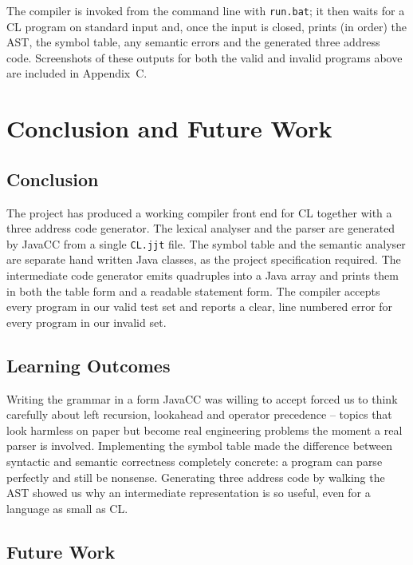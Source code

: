 \documentclass[12pt,a4paper]{report}
\begin{document}
The compiler is invoked from the command line with \texttt{run.bat}; it then waits for a CL program on standard input and, once the input is closed, prints (in order) the AST, the symbol table, any semantic errors and the generated three address code. Screenshots of these outputs for both the valid and invalid programs above are included in Appendix~C.

\chapter{Conclusion and Future Work}

\section{Conclusion}

The project has produced a working compiler front end for CL together with a three address code generator. The lexical analyser and the parser are generated by JavaCC from a single \texttt{CL.jjt} file. The symbol table and the semantic analyser are separate hand written Java classes, as the project specification required. The intermediate code generator emits quadruples into a Java array and prints them in both the table form and a readable statement form. The compiler accepts every program in our valid test set and reports a clear, line numbered error for every program in our invalid set.

\section{Learning Outcomes}

Writing the grammar in a form JavaCC was willing to accept forced us to think carefully about left recursion, lookahead and operator precedence -- topics that look harmless on paper but become real engineering problems the moment a real parser is involved. Implementing the symbol table made the difference between syntactic and semantic correctness completely concrete: a program can parse perfectly and still be nonsense. Generating three address code by walking the AST showed us why an intermediate representation is so useful, even for a language as small as CL.

\section{Future Work}
\end{document}
